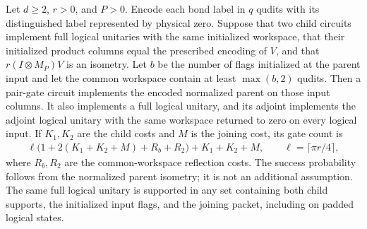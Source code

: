 \begin{lemma}
    \label{thm:mpu_encoded_merging}
    \leanok
    Let $d\geq2$, $r>0$, and $P>0$. Encode each bond label in $q$
    qudits with its distinguished label represented by physical zero.
    Suppose that two child circuits implement full logical unitaries
    with the same initialized workspace, that their initialized
    product columns equal the prescribed encoding of $V$, and that
    $r(I\otimes M_P)V$ is an isometry. Let $b$ be the number of flags
    initialized at the parent input and let the common workspace
    contain at least $\max(b,2)$ qudits.
    Then a pair-gate circuit implements the encoded normalized
    parent on those input columns. It also implements a full
    logical unitary, and its adjoint implements the adjoint logical
    unitary with the same workspace returned to zero on every
    logical input. If $K_1,K_2$ are the child costs and $M$ is the
    joining cost, its gate count is
    \begin{align}
        \ell\bigl(1+2(K_1+K_2+M)+R_b+R_2\bigr)+K_1+K_2+M,
        \qquad \ell=\lceil\pi r/4\rceil,
    \end{align}
    where $R_b,R_2$ are the common-workspace reflection costs.
    The success probability follows from the normalized parent
    isometry; it is not an additional assumption.
    The same full logical unitary is supported in any set containing
    both child supports, the initialized input flags, and the joining
    packet, including on padded logical states.
\end{lemma}
